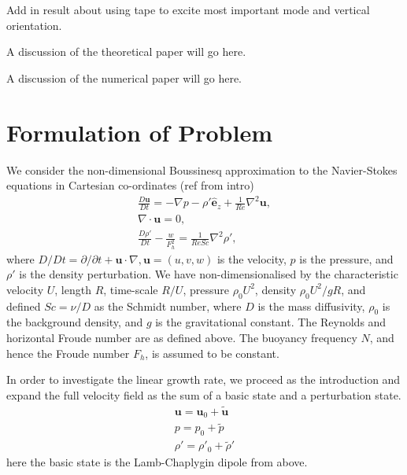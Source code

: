 Add in result about using tape to excite most important mode and vertical orientation. 

A discussion of the theoretical paper will go here.

A discussion of the numerical paper will go here.


\section{Formulation of Problem}
We consider the non-dimensional Boussinesq approximation to the Navier-Stokes equations in Cartesian co-ordinates (ref from intro)
\begin{align}
\frac{D\bm{u}}{Dt} = -\nabla p - \rho'\hat{\bm{e}}_{z} + \frac{1}{Re}\nabla^{2} \bm{u},\\
\nabla \cdot \bm{u}=0,\\
\frac{D\rho'}{Dt} -\frac{w}{F_{h}^{2}} = \frac{1}{ReSc}\nabla^{2} \rho',
\end{align}
where $D/Dt=\partial/\partial t + \bm{u}\cdot \nabla, \bm{u}=(u,v,w)$ is the velocity, $p$ is the pressure, and $\rho'$ is the density perturbation. We have non-dimensionalised by the characteristic velocity $U$, length $R$, time-scale $R/U$, pressure $\rho_{0}U^{2}$, density $\rho_{0}U^{2}/gR$, and defined $Sc=\nu /D$ as the Schmidt number, where $D$ is the mass diffusivity, $\rho_{0}$ is the background density, and $g$ is the gravitational constant. The Reynolds and horizontal Froude number are as defined above. The buoyancy frequency $N$, and hence the Froude number $F_{h}$, is assumed to be constant. 

In order to investigate the linear growth rate, we proceed as the introduction and expand the full velocity field as the sum of a basic state and a perturbation state. 
\begin{align}
\bm{u} = \bm{u}_{0} + \tilde{\bm{u}}\\
p = p_{0} + \tilde{p}\\
\rho' = \rho'_{0} + \tilde{\rho}' 
\end{align}
here the basic state is the Lamb-Chaplygin dipole from above. 


